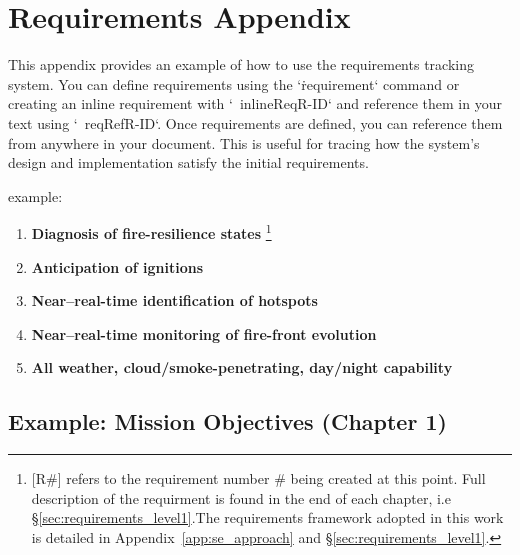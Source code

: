 \chapter{Requirements Appendix}\label{app:requirements}

This appendix provides an example of how to use the requirements tracking system. 
You can define requirements using the `\. requirement` command or creating an inline requirement with `\ inlineReq{R-ID}` and reference them in your text using `\ reqRef{R-ID}`.
Once requirements are defined, you can reference them from anywhere in your document. This is useful for tracing how the system's design and implementation satisfy the initial requirements.

example:

\begin{enumerate}\setlength{\itemsep}{0pt}\setlength{\parskip}{0pt}\setlength{\parsep}{0pt}
\item \textbf{Diagnosis of fire-resilience states }\footnote{[\rightarrow R\#] refers to the requirement number \# being created at this point. Full description of the requirment is found in the end of each chapter, i.e \S \ref{sec:requirements_level1}.The requirements framework adopted in this work is detailed in Appendix~\ref{app:se_approach} and \S\ref{sec:requirements_level1}.}
\item \textbf{Anticipation of ignitions }
\item \textbf{Near--real-time identification of hotspots }
\item \textbf{Near--real-time monitoring of fire-front evolution }
\item \textbf{All weather, cloud/smoke-penetrating, day/night capability }
\end{enumerate}



\section{Example: Mission Objectives (Chapter 1)}\label{sec:app_req_ch1}
